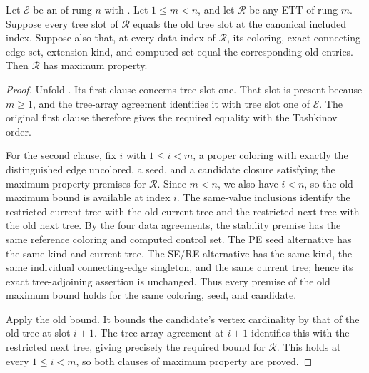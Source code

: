 \begin{lemma}
Let \(\mathcal E\) be an  of rung \(n\) with
.  Let \(1\leq m<n\), and let \(\mathcal R\) be any
ETT of rung \(m\).  Suppose every tree slot of \(\mathcal R\) equals the old
tree slot at the canonical included index.  Suppose also that, at every data
index of \(\mathcal R\), its coloring, exact connecting-edge set, extension
kind, and computed  set equal the corresponding
old entries.  Then \(\mathcal R\) has maximum property.
\end{lemma}
\begin{proof}
Unfold .  Its first clause concerns tree slot one.
That slot is present because \(m\geq1\), and the tree-array agreement identifies
it with tree slot one of \(\mathcal E\).  The original first clause therefore
gives the required equality with the Tashkinov order.

For the second clause, fix \(i\) with \(1\leq i<m\), a proper coloring with
exactly the distinguished edge uncolored, a seed, and a candidate closure
satisfying the maximum-property premises for \(\mathcal R\).  Since \(m<n\),
we also have \(i<n\), so the old maximum bound is available at index \(i\).
The same-value inclusions identify the restricted current tree with the old
current tree and the restricted next tree with the old next tree.  By the four
data agreements, the stability premise has the same reference coloring and
computed control set.  The PE seed alternative has the same kind and current
tree.  The SE/RE alternative has the same kind, the same individual
connecting-edge singleton, and the same current tree; hence its exact
tree-adjoining assertion is unchanged.  Thus every premise of the old maximum
bound holds for the same coloring, seed, and candidate.

Apply the old bound.  It bounds the candidate's vertex cardinality by that of
the old tree at slot \(i+1\).  The tree-array agreement at \(i+1\) identifies
this with the restricted next tree, giving precisely the required bound for
\(\mathcal R\).  This holds at every \(1\leq i<m\), so both clauses of maximum
property are proved.
\end{proof}

